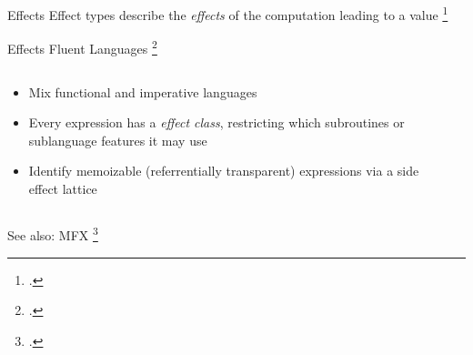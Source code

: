 \documentclass[aspectratio=169]{beamer}
\begin{document}
\begin{frame}{Effects}
    Effect types describe the \emph{effects} of the computation leading to a value \footcite{pierce_advanced_2005}
    \\
\end{frame}

\begin{frame}{Effects}
    Fluent Languages \footcite{gifford_integrating_1986}
  \begin{columns}[T]
    \begin{column}{0.68\textwidth}
        \begin{itemize}
            \item Mix functional and imperative languages %
            \item Every expression has a \emph{effect class}, restricting which subroutines or sublanguage features it may use
            \item Identify memoizable (referrentially transparent) expressions via a side effect lattice %
        \end{itemize}
    \end{column}

    \begin{column}{0.30\textwidth}
    \footnotesize{
    }
    \end{column}
  \end{columns}
    See also: MFX \footcite{lucassen_polymorphic_1988} %
\end{frame}

\end{document}
